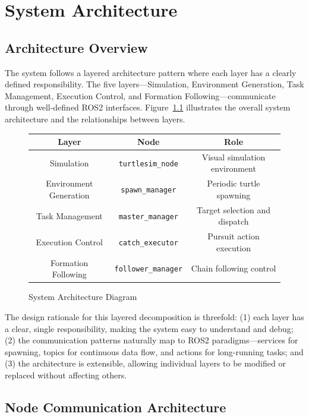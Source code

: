 \chapter{System Architecture\label{chap:architecture}}

\section{Architecture Overview}

The system follows a layered architecture pattern where each layer has a clearly defined responsibility. The five layers---Simulation, Environment Generation, Task Management, Execution Control, and Formation Following---communicate through well-defined ROS2 interfaces. Figure~\ref{fig:architecture} illustrates the overall system architecture and the relationships between layers.

\begin{figure}[htbp]
  \centering
  \caption{System Architecture Diagram}
  \label{fig:architecture}
  \vspace{0.5em}
  \begin{tabular}{c|c|c}
    \toprule
    \textbf{Layer} & \textbf{Node} & \textbf{Role} \\
    \midrule
    Simulation & \texttt{turtlesim\_node} & Visual simulation environment \\
    Environment Generation & \texttt{spawn\_manager} & Periodic turtle spawning \\
    Task Management & \texttt{master\_manager} & Target selection and dispatch \\
    Execution Control & \texttt{catch\_executor} & Pursuit action execution \\
    Formation Following & \texttt{follower\_manager} & Chain following control \\
    \bottomrule
  \end{tabular}
\end{figure}

The design rationale for this layered decomposition is threefold: (1) each layer has a clear, single responsibility, making the system easy to understand and debug; (2) the communication patterns naturally map to ROS2 paradigms---services for spawning, topics for continuous data flow, and actions for long-running tasks; and (3) the architecture is extensible, allowing individual layers to be modified or replaced without affecting others.

\section{Node Communication Architecture}


